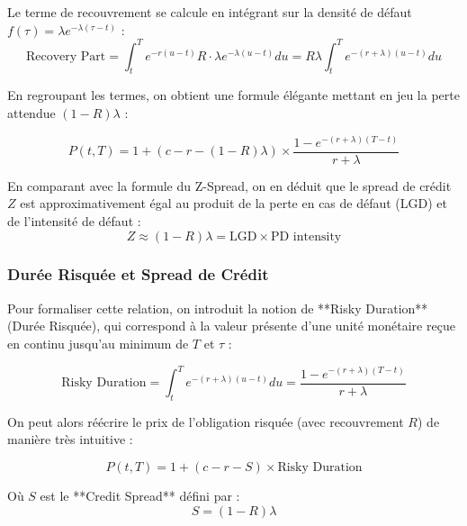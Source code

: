 Le terme de recouvrement se calcule en intégrant sur la densité de défaut $f(\tau) = \lambda e^{-\lambda(\tau-t)}$ :
\begin{equation}
    \text{Recovery Part} = \int_t^T e^{-r(u-t)} R \cdot \lambda e^{-\lambda(u-t)} du = R \lambda \int_t^T e^{-(r+\lambda)(u-t)} du
\end{equation}

En regroupant les termes, on obtient une formule élégante mettant en jeu la perte attendue $(1-R)\lambda$ :

\begin{equation}
    P(t, T) = 1 + (c - r - (1-R)\lambda) \times \frac{1 - e^{-(r+\lambda)(T-t)}}{r+\lambda}
\end{equation}

\begin{tcolorbox}[colback=blue!5!white,colframe=blue!75!black,title=Approximation du Spread]
    En comparant avec la formule du Z-Spread, on en déduit que le spread de crédit $Z$ est approximativement égal au produit de la perte en cas de défaut (LGD) et de l'intensité de défaut :
    \begin{equation}
        Z \approx (1-R)\lambda = \text{LGD} \times \text{PD intensity}
    \end{equation}
\end{tcolorbox}

\subsubsection{Durée Risquée et Spread de Crédit}

Pour formaliser cette relation, on introduit la notion de **Risky Duration** (Durée Risquée), qui correspond à la valeur présente d'une unité monétaire reçue en continu jusqu'au minimum de $T$ et $\tau$ :

\begin{equation}
    \text{Risky Duration} = \int_t^T e^{-(r+\lambda)(u-t)} du = \frac{1 - e^{-(r+\lambda)(T-t)}}{r+\lambda}
\end{equation}

On peut alors réécrire le prix de l'obligation risquée (avec recouvrement $R$) de manière très intuitive :

\begin{equation}
    P(t, T) = 1 + (c - r - S) \times \text{Risky Duration}
\end{equation}

Où $S$ est le **Credit Spread** défini par :
\begin{equation}
    S = (1-R)\lambda
\end{equation}

